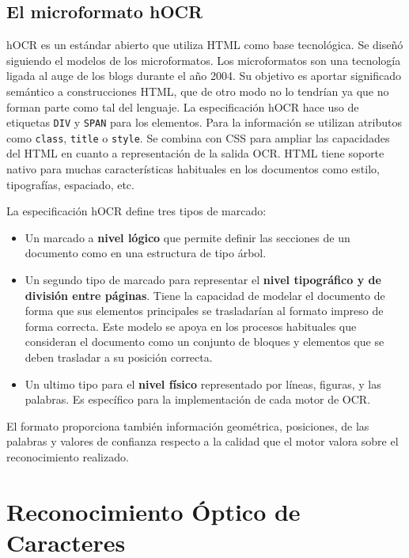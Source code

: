 \subsection{El microformato hOCR}

hOCR es un estándar abierto que utiliza HTML como base tecnológica. Se diseñó siguiendo el modelos de los microformatos. Los microformatos son una tecnología ligada al auge de los blogs durante el año 2004. Su objetivo es aportar significado semántico a construcciones HTML, que de otro modo no lo tendrían ya que no forman parte como tal del lenguaje. La especificación hOCR hace uso de etiquetas \verb|DIV| y \verb|SPAN| para los elementos. Para la información se utilizan atributos como \verb|class|, \verb|title| o \verb|style|. Se combina con CSS para ampliar las capacidades del HTML en cuanto a representación de la salida OCR. HTML tiene soporte nativo para muchas características habituales en los documentos como estilo, tipografías, espaciado, etc.

La especificación hOCR define tres tipos de marcado:

\begin{itemize}
    \item Un marcado a \textbf{nivel lógico} que permite definir las secciones de un documento como en una estructura de tipo árbol.
    \item Un segundo tipo de marcado para representar el \textbf{nivel tipográfico y de división entre páginas}. Tiene la capacidad de modelar el documento de forma  que sus elementos principales se trasladarían al formato impreso de forma correcta. Este modelo se apoya en los procesos habituales que consideran el documento como un conjunto de bloques y elementos que se deben trasladar a su posición correcta.
    \item Un ultimo tipo para el \textbf{nivel físico} representado por líneas, figuras, y las palabras. Es específico para la implementación de cada motor de OCR. 
\end{itemize}

El formato proporciona también información geométrica, posiciones, de las palabras y valores de confianza respecto a la calidad que el motor valora sobre el reconocimiento realizado.

\section{Reconocimiento Óptico de Caracteres}
\label{sec:rec-optico-caracteres}

